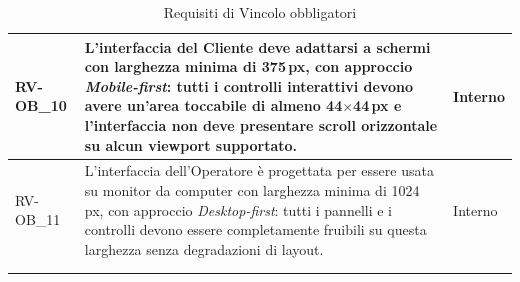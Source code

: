 \begin{longtable}{|>{\raggedright}p{}|>{\raggedright\arraybackslash}p{}|>{\raggedright\arraybackslash}p{}|}
    \hline
    RV-OB\_10 \hypertarget{rv-ob_10} & L'interfaccia del Cliente deve adattarsi a schermi con larghezza minima di 375\,px, con approccio \textit{Mobile-first}: tutti i controlli interattivi devono avere un'area toccabile di almeno 44$\times$44\,px e l'interfaccia non deve presentare scroll orizzontale su alcun viewport supportato. & Interno \\
    \hline
    RV-OB\_11 \hypertarget{rv-ob_11} & L'interfaccia dell'Operatore è progettata per essere usata su monitor da computer con larghezza minima di 1024\,px, con approccio \textit{Desktop-first}: tutti i pannelli e i controlli devono essere completamente fruibili su questa larghezza senza degradazioni di layout. & Interno \\
    \hline
    \multicolumn{3}{c}{} \\
    \caption{Requisiti di Vincolo obbligatori}\hypertarget{tab:vincolo_obbligatori}\\
\end{longtable}
